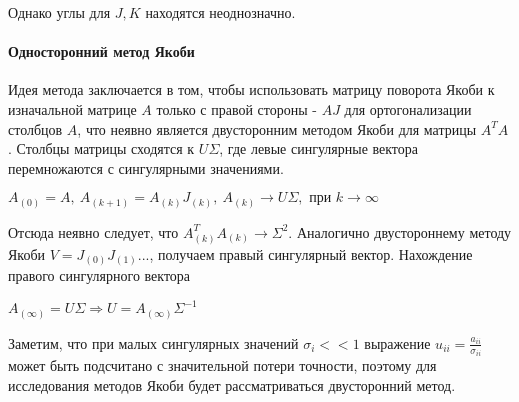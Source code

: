 Однако углы для $J, K$ находятся неоднозначно.
\paragraph{Односторонний метод Якоби}

Идея метода заключается в том, чтобы использовать матрицу поворота Якоби к изначальной матрице $A$ только с правой стороны - $AJ$ для ортогонализации столбцов $A$, что неявно является двусторонним методом Якоби для матрицы $A^TA$.
Столбцы матрицы сходятся к $U\Sigma$, где левые сингулярные вектора перемножаются с сингулярными значениями.
\begin{center}
     $A_{(0)}=A,\ A_{(k+1)} = A_{(k)}J_{(k)},\ A_{(k)} \longrightarrow U\Sigma, \text{ при } k\to\infty$
 \end{center}
 Отсюда неявно следует, что $A^T_{(k)}A_{(k)} \to \Sigma^2$. Аналогично двустороннему методу Якоби $V = J_{(0)}J_{(1)}...$, получаем правый сингулярный вектор. Нахождение правого сингулярного вектора 
 \begin{center}
     $A_{(\infty)} = U\Sigma \Rightarrow U = A_{(\infty)}\Sigma^{-1}$
 \end{center}
 Заметим, что при малых сингулярных значений $\sigma_i<<1$ выражение $u_{ii} = \frac{a_{ii}}{\sigma_{ii}}$ может быть подсчитано с значительной потери точности, поэтому для исследования методов Якоби будет рассматриваться двусторонний метод.

